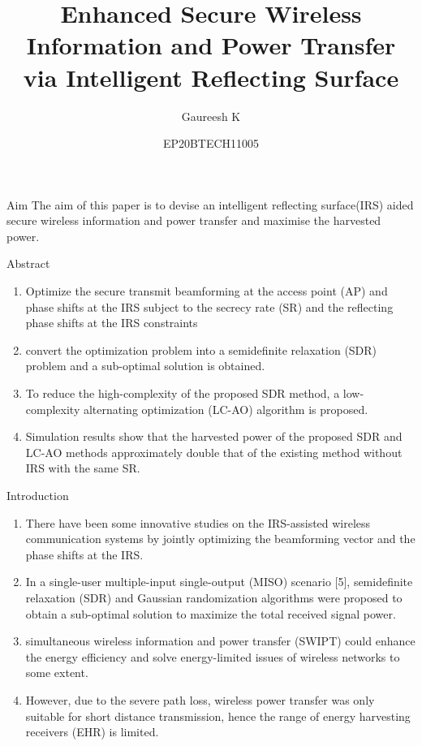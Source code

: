 \documentclass{beamer}
\title{Enhanced Secure Wireless Information and Power Transfer via Intelligent Reflecting Surface}
\author{Gaureesh K}
\date{EP20BTECH11005}
\begin{document}
\begin{frame}
\titlepage
\end{frame}
\begin{frame}{Aim}
    The aim of this paper is to devise an intelligent reflecting surface(IRS) aided
    secure wireless information and power transfer and maximise the harvested power.
    
\end{frame}

\begin{frame}{Abstract}
\begin{enumerate}
    \item Optimize the secure transmit beamforming
at the access point (AP) and phase shifts at the IRS subject to
the secrecy rate (SR) and the reflecting phase shifts at the IRS
constraints
    \item convert the optimization
problem into a semidefinite relaxation (SDR) problem and a
sub-optimal solution is obtained.
    \item To reduce the high-complexity
of the proposed SDR method, a low-complexity alternating
optimization (LC-AO) algorithm is proposed.
    \item  Simulation results
show that the harvested power of the proposed SDR and LC-AO
methods approximately double that of the existing method
without IRS with the same SR.
\end{enumerate}

\end{frame}

\begin{frame}{Introduction}
\begin{enumerate}
    \item There have been some innovative studies on the IRS-assisted wireless communication systems by jointly optimizing the beamforming vector and the phase shifts at the IRS.
    
    \item In a single-user multiple-input single-output
(MISO) scenario [5], semidefinite relaxation (SDR) and
Gaussian randomization algorithms were proposed to obtain
a sub-optimal solution to maximize the total received signal
power.
    
    \item simultaneous wireless information and
power transfer (SWIPT) could enhance the energy efficiency
and solve energy-limited issues of wireless networks to some
extent.
    \item However, due to the severe path loss, wireless power
transfer was only suitable for short distance transmission,
hence the range of energy harvesting receivers (EHR) is limited.
\end{enumerate}
\end{frame}
\end{document}
